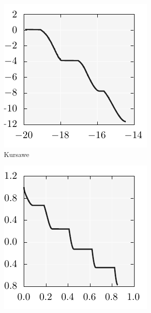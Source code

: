 \documentclass{stdlocal}
\begin{document}
    \begin{figure}[t]
      \center
      \begin{subfigure}[b]{0.24\textwidth}
        \center
        \includegraphics[width=\textwidth]{../../plots/kursawe_wrong.pdf}
        \caption{Kursawe}
      \end{subfigure}
      \begin{subfigure}[b]{0.24\textwidth}
        \center
        \includegraphics[width=\textwidth]{../../plots/zdt3_wrong.pdf}

\end{subfigure}
\end{figure}
\end{document}
